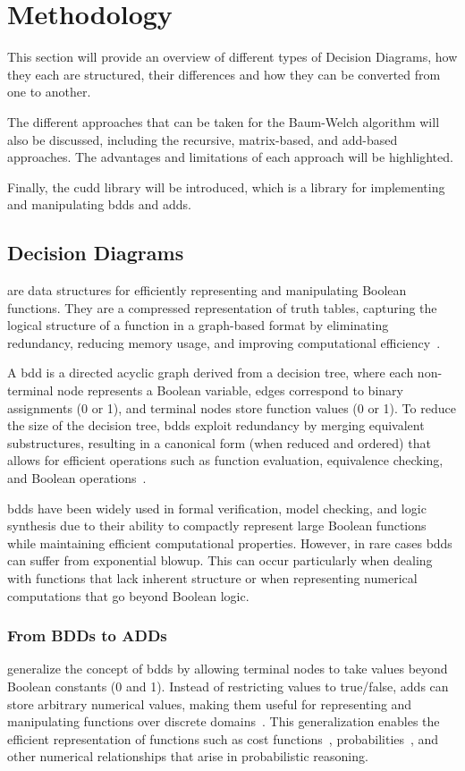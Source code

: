 \section{Methodology}\label{sec:methodology}
This section will provide an overview of different types of Decision Diagrams, how they each are structured, their differences and how they can be converted from one to another.

The different approaches that can be taken for the Baum-Welch algorithm will also be discussed, including the recursive, matrix-based, and \gls{add}-based approaches. The advantages and limitations of each approach will be highlighted.

Finally, the \gls{cudd} library will be introduced, which is a library for implementing and manipulating \glspl{bdd} and \glspl{add}.

\subsection{Decision Diagrams}\label{subsec:decision-diagrams}
 are data structures for efficiently representing and manipulating Boolean functions.
They are a compressed representation of truth tables, capturing the logical structure of a function in a graph-based format by eliminating redundancy, reducing memory usage, and improving computational efficiency~\cite{bryant1986graph}.

A \gls{bdd} is a directed acyclic graph derived from a decision tree, where each non-terminal node represents a Boolean variable, edges correspond to binary assignments (0 or 1), and terminal nodes store function values (0 or 1).
To reduce the size of the decision tree, \glspl{bdd} exploit redundancy by merging equivalent substructures, resulting in a canonical form (when reduced and ordered) that allows for efficient operations such as function evaluation, equivalence checking, and Boolean operations~\cite{bryant1986graph}.

\glspl{bdd} have been widely used in formal verification, model checking, and logic synthesis due to their ability to compactly represent large Boolean functions while maintaining efficient computational properties.
However, in rare cases \glspl{bdd} can suffer from exponential blowup. This can occur particularly when dealing with functions that lack inherent structure or when representing numerical computations that go beyond Boolean logic.

\subsubsection{From BDDs to ADDs}\label{subsubsec:adds}
 generalize the concept of \glspl{bdd} by allowing terminal nodes to take values beyond Boolean constants (0 and 1).
Instead of restricting values to true/false, \glspl{add} can store arbitrary numerical values, making them useful for representing and manipulating functions over discrete domains~\cite{bahar1997algebric}.
This generalization enables the efficient representation of functions such as cost functions~\cite{kwiatkowska2004probabilistic}, probabilities~\cite{baier1997symbolic}, and other numerical relationships that arise in probabilistic reasoning.

